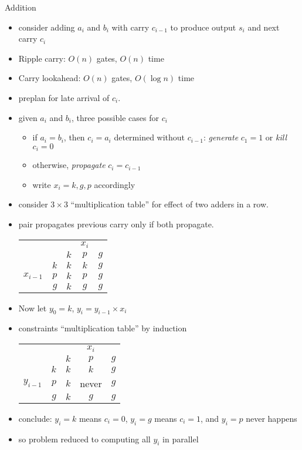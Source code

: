 \documentclass[12pt]{article}
\begin{document}
Addition
\begin{itemize}
\item consider adding $a_i$ and $b_i$ with carry $c_{i-1}$ to produce
  output $s_i$ and next carry $c_i$
\item Ripple carry: $O(n)$ gates, $O(n)$ time
\item Carry lookahead: $O(n)$ gates, $O(\log n)$ time
\item preplan for late arrival of $c_i$.
\item given $a_i$ and $b_i$, three possible cases for $c_i$
\begin{itemize}
\item if $a_i=b_i$, then $c_i=a_i$ determined without $c_{i-1}$:
  \emph{generate} $c_1=1$ or \emph{kill} $c_i=0$
\item otherwise, \emph{propagate} $c_i=c_{i-1}$
\item write $x_i=k,g,p$ accordingly
\end{itemize}
\item consider $3 \times 3$ ``multiplication table'' for effect of two
  adders in a row.  
\item pair propagates previous carry only if both propagate.
\begin{tabular}{rr|c|c|c}
            &&   &$x_i$&\\
            &&$k$&$p$&$g$\\
\hline
         &$k$&$k$&$k$  &$g$\\
$x_{i-1}$&$p$&$k$&$p$  &$g$\\
         &$g$&$k$&$g$  &$g$\\
\end{tabular}
\item Now let $y_0=k$, $y_i = y_{i-1} \times x_i$
\item constraints ``multiplication table'' by induction
\begin{tabular}{rr|c|c|c}
            &&   &$x_i$&\\
            &&$k$&$p$&$g$\\
\hline
         &$k$&$k$&$k$  &$g$\\
$y_{i-1}$&$p$&$k$&never&$g$\\
         &$g$&$k$&$g$  &$g$\\
\end{tabular}
\item conclude: $y_i=k$ means $c_i=0$, $y_i=g$ means $c_i=1$, and
  $y_i=p$ never happens
\item so problem reduced to computing all $y_i$ in parallel
\end{itemize}
\end{document}
